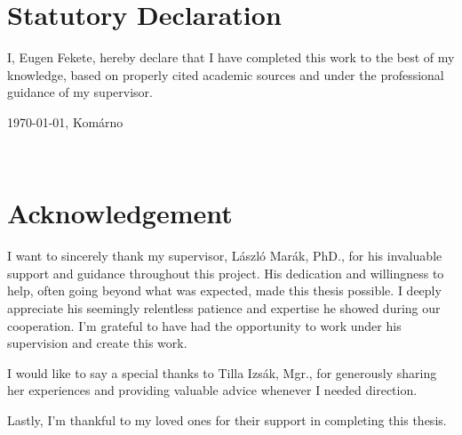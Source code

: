 \documentclass[a4paper,oneside,onecolumn,12pt]{book}
\newcommand{\dotsignline}[1]{%
  \makebox[.5\linewidth][c]{%
    \xleaders\hbox to .2em{\d{}}\hfill\d{}
  }\\[-0.2em]
  \makebox[.5\linewidth][c]{#1}%
}
\begin{document}
\let\ps@plain\ps@empty
\makeatother
\endgroup
\thispagestyle{empty}
{

\pagebreak
}

\section*{Statutory Declaration}
\thispagestyle{empty}
I, Eugen Fekete, hereby declare that I have completed this work to the best of my knowledge, based on properly cited academic sources and under the professional guidance of my supervisor.

\vspace{2\baselineskip}
\noindent
\begin{minipage}[t]{0.45\linewidth}
  \today, Komárno
\end{minipage}%
\hfill
\begin{minipage}[t]{0.45\linewidth}
  \dotsignline{signature}
\end{minipage}
\pagebreak

\section*{Acknowledgement}
\thispagestyle{empty}
I want to sincerely thank my supervisor, László Marák, PhD., for his invaluable support and guidance throughout this project. His dedication and willingness to help, often going beyond what was expected, made this thesis possible. I deeply appreciate his seemingly relentless patience and expertise he showed during our cooperation. I'm grateful to have had the opportunity to work under his supervision and create this work.

I would like to say a special thanks to Tilla Izsák, Mgr., for generously sharing her experiences and providing valuable advice whenever I needed direction.

Lastly, I'm thankful to my loved ones for their support in completing this thesis.
\pagebreak

\newcommand{\chpt}[1]{\section*{#1}}
\end{document}
